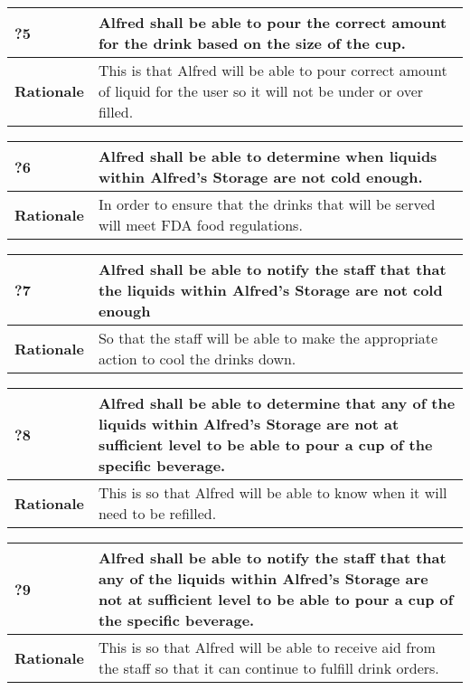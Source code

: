 \documentclass [11pt]{article}
\begin{document}
\begin{longtable}{| p{ } | p{ } | }\hline 
	\rowcolor{tableCell}\textbf{?5} & Alfred shall be able to pour the correct amount for the drink based on the size of the cup.\\ \hline
	\textbf{Rationale} &  This is that Alfred will be able to pour correct amount of liquid for the user so it will not be under or over filled. \\ \hline 
\end{longtable}

\begin{longtable}{| p{ } | p{ } | }\hline 
	\rowcolor{tableCell}\textbf{?6} & Alfred shall be able to determine when liquids within Alfred's Storage are not cold enough.\\ \hline
	\textbf{Rationale} &  In order to ensure that the drinks that will be served will meet FDA food regulations. \\ \hline 
\end{longtable}

\begin{longtable}{| p{ } | p{ } | }\hline 
	\rowcolor{tableCell}\textbf{?7} & Alfred shall be able to notify the staff that that the liquids within Alfred's Storage are not cold enough\\ \hline
	\textbf{Rationale} &  So that the staff will be able to make the appropriate action to cool the drinks down.\\ \hline 
\end{longtable}

\begin{longtable}{| p{ } | p{ } | }\hline 
	\rowcolor{tableCell}\textbf{?8} & Alfred shall be able to determine that any of the liquids within Alfred's Storage are not at sufficient level to be able to pour a cup of the specific beverage. \\ \hline
	\textbf{Rationale} &  This is so that Alfred will be able to know when it will need to be refilled.\\ \hline 
\end{longtable}

\begin{longtable}{| p{ } | p{ } | }\hline 
	\rowcolor{tableCell}\textbf{?9} & Alfred shall be able to notify the staff that that any of the liquids within Alfred's Storage are not at sufficient level to be able to pour a cup of the specific beverage. \\ \hline
	\textbf{Rationale} &  This is so that Alfred will be able to receive aid from the staff so that it can continue to fulfill drink orders.\\ \hline 
\end{longtable}
\end{document}
